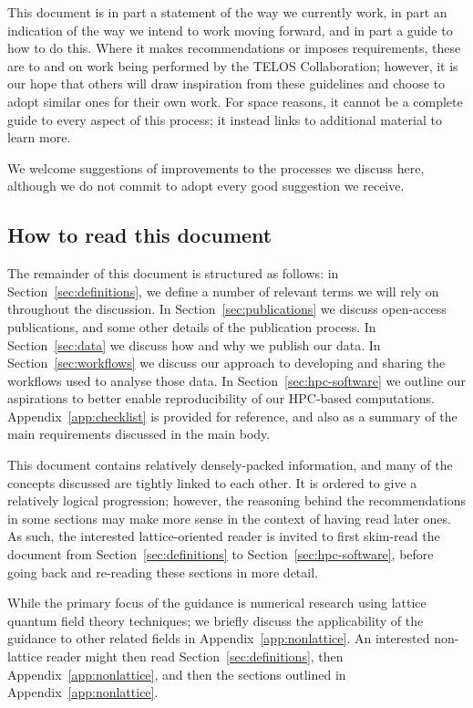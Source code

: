 \documentclass{article}
\begin{document}
This document is in part a statement of the way we currently work,
in part an indication of the way we intend to work moving forward,
and in part a guide to how to do this.
Where it makes recommendations or imposes requirements,
these are to and on work being performed by the TELOS Collaboration;
however,
it is our hope that others will draw inspiration from these guidelines
and choose to adopt similar ones for their own work.
For space reasons,
it cannot be a complete guide to every aspect of this process;
it instead links to additional material to learn more.

We welcome suggestions of improvements to the processes we discuss here,
although we do not commit to adopt every good suggestion we receive.

\tableofcontents

\subsection{How to read this document}

The remainder of this document is structured as follows:
in Section~\ref{sec:definitions},
we define a number of relevant terms we will rely on throughout the discussion.
In Section~\ref{sec:publications} we discuss open-access publications,
and some other details of the publication process.
In Section~\ref{sec:data} we discuss how and why we publish our data.
In Section~\ref{sec:workflows} we discuss our approach to developing and sharing
the workflows used to analyse those data.
In Section~\ref{sec:hpc-software} we outline our aspirations to
better enable reproducibility of our HPC-based computations.
Appendix~\ref{app:checklist} is provided for reference,
and also as a summary of the main requirements discussed in the main body.

This document contains relatively densely-packed information,
and many of the concepts discussed are tightly linked to each other.
It is ordered to give a relatively logical progression;
however,
the reasoning behind the recommendations in some sections
may make more sense in the context of having read later ones.
As such,
the interested lattice-oriented reader is invited to first skim-read the document
from Section~\ref{sec:definitions} to Section~\ref{sec:hpc-software},
before going back and re-reading these sections in more detail.

While the primary focus of the guidance is
numerical research using lattice quantum field theory techniques;
we briefly discuss the applicability of the guidance to other related fields
in Appendix~\ref{app:nonlattice}.
An interested non-lattice reader might then read Section~\ref{sec:definitions},
then Appendix~\ref{app:nonlattice},
and then the sections outlined in Appendix~\ref{app:nonlattice}.
\end{document}
